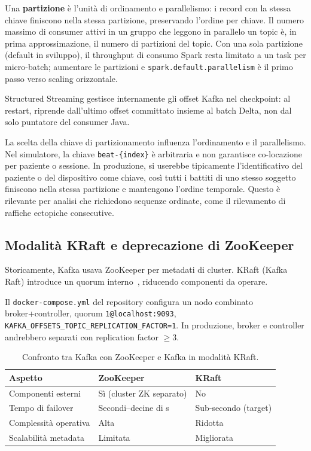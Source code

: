 Una \textbf{partizione} è l'unità di ordinamento e parallelismo: i record con la stessa chiave finiscono nella stessa partizione, preservando l'ordine per chiave.
Il numero massimo di consumer attivi in un gruppo che leggono in parallelo un topic è, in prima approssimazione, il numero di partizioni del topic.
Con una sola partizione (default in sviluppo), il throughput di consumo Spark resta limitato a un task per micro-batch; aumentare le partizioni e \texttt{spark.default.parallelism} è il primo passo verso scaling orizzontale.

Structured Streaming gestisce internamente gli offset Kafka nel checkpoint: al restart, riprende dall'ultimo offset committato insieme al batch Delta, non dal solo puntatore del consumer Java.

La scelta della chiave di partizionamento influenza l'ordinamento e il parallelismo.
Nel simulatore, la chiave \texttt{beat-\{index\}} è arbitraria e non garantisce co-locazione per paziente o sessione.
In produzione, si userebbe tipicamente l'identificativo del paziente o del dispositivo come chiave, così tutti i battiti di uno stesso soggetto finiscono nella stessa partizione e mantengono l'ordine temporale.
Questo è rilevante per analisi che richiedono sequenze ordinate, come il rilevamento di raffiche ectopiche consecutive.

\subsection{Modalità KRaft e deprecazione di ZooKeeper}

Storicamente, Kafka usava ZooKeeper per metadati di cluster.
KRaft (Kafka Raft) introduce un quorum interno~\cite{apache2023kraft}, riducendo componenti da operare.

Il \texttt{docker-compose.yml} del repository configura un nodo combinato broker+controller, quorum \texttt{1@localhost:9093}, \texttt{KAFKA\_OFFSETS\_TOPIC\_REPLICATION\_FACTOR=1}.
In produzione, broker e controller andrebbero separati con replication factor $\geq 3$.

\begin{table}[H]
  \centering
  \caption{Confronto tra Kafka con ZooKeeper e Kafka in modalità KRaft.}
  \label{tab:kraft-vs-zk}
  \begin{tabular}{@{}lll@{}}
    \toprule
    \textbf{Aspetto} & \textbf{ZooKeeper} & \textbf{KRaft} \\
    \midrule
    Componenti esterni & Sì (cluster ZK separato) & No \\
    Tempo di failover & Secondi--decine di s & Sub-secondo (target) \\
    Complessità operativa & Alta & Ridotta \\
    Scalabilità metadata & Limitata & Migliorata \\
    \bottomrule
  \end{tabular}
\end{table}

